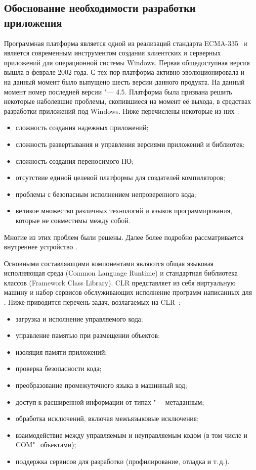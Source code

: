 \subsection{Обоснование необходимости разработки приложения}
\label{sub:theory_and_motivation:motivation}
Программная платформа \dotnet{} является одной из реализаций стандарта ECMA-335~\cite{ecma_335} и является современным инструментом создания клиентских и серверных приложений для операционной системы Windows.
Первая общедоступная версия \netfx{} вышла в феврале 2002 года.
С тех пор платформа активно эволюционировала и на данный момент было выпущено шесть версии данного продукта.
На данный момент номер последней версии \netfx{} "--- 4.5.
Платформа \dotnet{} была призвана решить некоторые наболевшие проблемы, скопившиеся на момент её выхода, в средствах разработки приложений под Windows. 
Ниже перечислены некоторые из них~\cite[с.~\,--\,]{richter_2007_ru}:
\begin{itemize}
  \item сложность создания надежных приложений;
  \item сложность развертывания и управления версиями приложений и библиотек;
  \item сложность создания переносимого ПО;
  \item отсутствие единой целевой платформы для создателей компиляторов;
  \item проблемы с безопасным исполнением непроверенного кода;
  \item великое множество различных технологий и языков программирования, которые не совместимы между собой.
\end{itemize}

Многие из этих проблем были решены.
Далее более подробно рассматривается внутреннее устройство \dotnet{}.

Основными составляющими компонентами \dotnet{} являются общая языковая исполняющая среда (Common Language Runtime) и стандартная библиотека классов (Framework Class Library).
CLR представляет из себя виртуальную машину и набор сервисов обслуживающих исполнение программ написанных для \dotnet{}.
Ниже приводится перечень задач, возлагаемых на CLR~\cite{marchenko_2007}:
\begin{itemize}
  \item загрузка и исполнение управляемого кода;
  \item управление памятью при размещении объектов;
  \item изоляция памяти приложений;
  \item проверка безопасности кода;
  \item преобразование промежуточного языка в машинный код;
  \item доступ к расширенной информации от типах "--- метаданным;
  \item обработка исключений, включая межъязыковые исключения;
  \item взаимодействие между управляемым и неуправляемым кодом (в том числе и COM"=объектами);
  \item поддержка сервисов для разработки (профилирование, отладка и т.\,д.).
\end{itemize}

